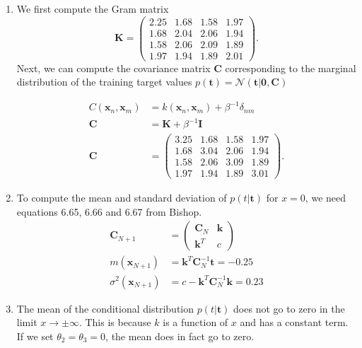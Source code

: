 \documentclass[a4paper]{article}
\begin{document}
\begin{enumerate}
\item 
We first compute the Gram matrix
\begin{equation*}
\bm{K} = 
\begin{pmatrix}
2.25 & 1.68 & 1.58 & 1.97 \\
1.68 & 2.04 & 2.06 & 1.94 \\
1.58 & 2.06 & 2.09 & 1.89 \\
1.97 & 1.94 & 1.89 & 2.01
\end{pmatrix}.
\end{equation*}
Next, we can compute the covariance matrix $\bm{C}$ corresponding to the marginal distribution of the training target values $p(\bm{t}) = \mathcal{N}(\bm{t}|\bm{0}, \bm{C})$

\begin{align}
C(\bm{x}_n, \bm{x}_m) &= k(\bm{x}_n, \bm{x}_m) + \beta^{-1}\delta_{nm} \\
\bm{C} &= \bm{K} + \beta^{-1}\bm{I} \\
\bm{C} &= 
\begin{pmatrix}
3.25 & 1.68 & 1.58 & 1.97 \\
1.68 & 3.04 & 2.06 & 1.94 \\
1.58 & 2.06 & 3.09 & 1.89 \\
1.97 & 1.94 & 1.89 & 3.01 \nonumber
\end{pmatrix}.
\end{align}


\item To compute the mean and standard deviation of $p(t|\bm{t})$ for $x=0$, we need equations 6.65, 6.66 and 6.67 from Bishop.
\begin{align}
\bm{C}_{N+1} &= \begin{pmatrix}\bm{C}_N & \bm{k} \\ \bm{k}^T & c\end{pmatrix} \\
m(\bm{x}_{N+1}) &= \bm{k}^T\bm{C}_N^{-1}\bm{t}=-0.25 \\
\sigma^2(\bm{x}_{N+1}) &= c - \bm{k}^T\bm{C}_N^{-1}\bm{k}=0.23
\end{align}


\item The mean of the conditional distribution $p(t|\bm{t})$ does not go to zero in the limit $x \rightarrow \pm\infty$. This is because $k$ is a function of $x$ and has a constant term. If we set $\theta_2 = \theta_3 = 0$, the mean does in fact go to zero.

\end{enumerate}
\end{document}
